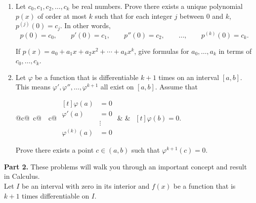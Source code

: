 \documentclass[12pt]{article}
\begin{document}
\begin{enumerate}
    \item
          Let \(c_{0}, c_{1}, c_{2},\dots,c_{k}\) be real numbers. Prove there exists a unique polynomial \(p(x)\) of order at most \(k\) such that for each integer \(j\) between 0 and \(k\), \(p^{(j)}(0) = c_{j}\). In other words,
          \[
              p(0) = c_{0}, \qquad p'(0) = c_{1}, \qquad p''(0) = c_{2}, \qquad \ldots, \qquad  p^{(k)}(0) = c_{k}.
          \]

          If \(p(x) = a_{0} + a_{1}x + a_{2}x^{2} + \cdots + a_{k}x^{k}\), give formulas for \(a_{0},\dots,a_{k}\) in terms of \(c_{0},\dots,c_{k}\).
          \vfill
    \item
          Let \(\varphi\) be a function that is differentiable \(k + 1\) times on an interval \([a,b]\). This means \(\varphi',\varphi'',\dots,\varphi^{k + 1}\) all exist on \([a,b]\). Assume that

          \begin{table}[htbp]
              \centering
              \begin{tabular}{@{}c@{\qquad\quad~}c@{\qquad\quad~~}c@{}}
                  \(\begin{aligned}[t]
                        \varphi(a)       & = 0    \\
                        \varphi'(a)      & = 0    \\
                                         & \vdots \\
                        \varphi^{(k)}(a) & = 0
                    \end{aligned}\)
                   &  &
                  \(\begin{aligned}[t]
                        \varphi(b) = 0.
                    \end{aligned}\)
              \end{tabular}
          \end{table}


          Prove there exists a point \(c \in (a,b)\) such that \(\varphi^{{k + 1}}(c) = 0\).

\end{enumerate}
\newpage
\noindent\textbf{Part 2.} These problems will walk you through an important concept and result in Calculus.\\

Let \(I\) be an interval with zero in its interior and \(f(x)\) be a function that is \(k + 1\) times differentiable on \(I\).
\end{document}
